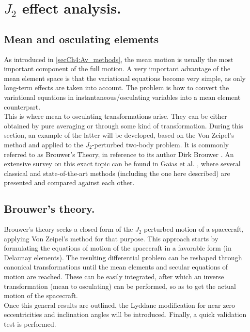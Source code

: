 \section{$J_2$ effect analysis.}
	\subsection{Mean and osculating elements}\label{secCh4:mean2osc}
	\indent As introduced in \ref{secCh4:Av_methods}, the mean motion is usually the most important component of the full motion. A very important advantage of the mean element space is that the variational equations become very simple, as only long-term effects are taken into account. The problem is how to convert the variational equations in instantaneous/osculating variables into a mean element counterpart. \\
	\indent This is where mean to osculating transformations arise. They can be either obtained by pure averaging or through some kind of transformation. During this section, an example of the latter will be developed, based on the Von Zeipel's method and applied to the $J_2$-perturbed two-body problem. It is commonly referred to as Brouwer's Theory, in reference to its author Dirk Brouwer \cite{Brouwer_paper}. An extensive survey on this exact topic can be found in Gaias et al. \cite{Gaias_mean2osc}, where several classical and state-of-the-art methods (including the one here described) are presented and compared against each other. \\
	\subsection{Brouwer's theory.}
	\indent Brouwer's theory seeks a closed-form of the $J_2$-perturbed motion of a spacecraft, applying Von Zeipel's method for that purpose. This approach starts by formulating the equations of motion of the spacecraft in a favorable form (\ie in Delaunay elements). The resulting differential problem can be reshaped through canonical transformations until the mean elements and secular equations of motion are reached. These can be easily integrated, after which an inverse transformation (\ie mean to osculating) can be performed, so as to get the actual motion of the spacecraft. \\
	\indent Once this general results are outlined, the Lyddane modification \cite{Lyddane} for near zero eccentricities and inclination angles will be introduced. Finally, a quick validation test is performed.

